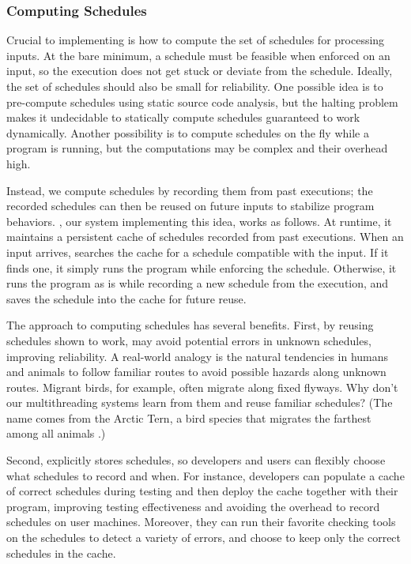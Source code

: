 \subsubsection{Computing Schedules} \label{sec:memoize}


Crucial to implementing \smt is how to compute the set of schedules for
processing inputs.  At the bare minimum, a schedule must be feasible when
enforced on an input, so the execution does not get stuck or deviate from
the schedule.  Ideally, the set of schedules should also be small for
reliability.  One possible idea is to pre-compute schedules using static
source code analysis, but the halting problem makes it undecidable to
statically compute schedules guaranteed to work dynamically.  Another
possibility is to compute schedules on the fly while a program is running,
but the computations may be complex and their overhead high.

Instead, we compute schedules by recording them from past executions; the
recorded schedules can then be reused on future inputs to stabilize
program behaviors.  \tern, our system implementing this idea, works as
follows.  At runtime, it maintains a persistent cache of schedules
recorded from past executions.  When an input arrives, \tern searches the
cache for a schedule compatible with the input.  If it finds one, it
simply runs the program while enforcing the schedule.  Otherwise, it runs
the program as is while recording a new schedule from the execution, and
saves the schedule into the cache for future reuse.

The \tern approach to computing schedules has several benefits. First, by
reusing schedules shown to work, \tern may avoid potential errors in
unknown schedules, improving reliability.  A real-world analogy is the
natural tendencies in humans and animals to follow familiar routes to
avoid possible hazards along unknown routes.  Migrant birds, for example,
often migrate along fixed flyways.  Why don't our multithreading systems
learn from them and reuse familiar schedules?  (The name \tern comes from
the Arctic Tern, a bird species that migrates the farthest among all
animals%
.)

Second, \tern explicitly stores schedules, so developers and users can
flexibly choose what schedules to record and when.  For instance,
developers can populate a cache of correct schedules during testing and
then deploy the cache together with their program, improving testing
effectiveness and avoiding the overhead to record schedules on user
machines.  Moreover, they can run their favorite checking tools on the
schedules to detect a variety of errors, and choose to keep only the
correct schedules in the cache.

